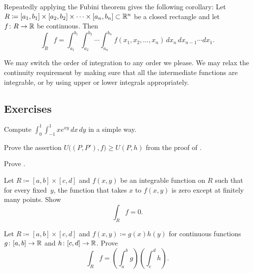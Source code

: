 Repeatedly applying the Fubini theorem gives the following
corollary:
Let $R \coloneqq [a_1,b_1] \times [a_2,b_2] \times \cdots \times [a_n,b_n] \subset
{\mathbb{R}}^n$ be a closed rectangle and let
$f \colon R \to {\mathbb{R}}$ be continuous.  Then
\begin{equation*}
\int_R f = 
\int_{a_1}^{b_1}
\int_{a_2}^{b_2}
\cdots
\int_{a_n}^{b_n}
f(x_1,x_2,\ldots,x_n)
\,
dx_n
\,
dx_{n-1}
\cdots
dx_1 .
\end{equation*}

We may switch the order of integration to any order we please.
We may relax the continuity requirement by making sure that all the
intermediate functions are integrable, or by using upper or lower integrals
appropriately.

\subsection{Exercises}

\begin{exercise}
Compute $\int_{0}^1 \int_{-1}^1 xe^{xy} \, dx \, dy$ in a simple way.
\end{exercise}

\begin{exercise}
Prove the assertion
$U\bigl((P,P'),f\bigr) \geq U(P,h)$ from the proof
of .
\end{exercise}

\begin{exercise}[Easy]
Prove .
\end{exercise}

\begin{exercise}
Let $R \coloneqq [a,b] \times [c,d]$ and $f(x,y)$ be an integrable
function on $R$ such that
for every fixed~$y$, the function that takes $x$ to $f(x,y)$
is zero except at finitely many points.  Show
\begin{equation*}
\int_R f = 0 .
\end{equation*}
\end{exercise}

\begin{exercise}
Let $R \coloneqq [a,b] \times [c,d]$ and $f(x,y) \coloneqq g(x)h(y)$ for continuous
functions $g \colon [a,b] \to {\mathbb{R}}$ and
$h \colon [c,d] \to {\mathbb{R}}$.  Prove
\begin{equation*}
\int_R f = \left(\int_a^b g\right)\left(\int_c^d h\right) .
\end{equation*}
\end{exercise}

